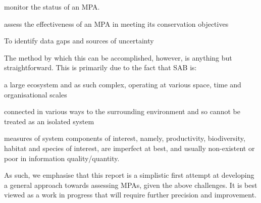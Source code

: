 \documentclass[letterpaper,portrait,12pt]{scrartcl}
\numberwithin{equation}{section}		%
\numberwithin{figure}{section}			%
\numberwithin{table}{section}				%
\begin{document}
\begin{flushleft}

	monitor the status of an MPA.

\end{flushleft}


\begin{flushleft}

	assess the effectiveness of an MPA in meeting its conservation objectives

\end{flushleft}


\begin{flushleft}

	To identify data gaps and sources of uncertainty 

\end{flushleft}








The method by which this can be accomplished, however, is anything but straightforward. This is primarily due to the fact that SAB is:








\begin{flushleft}

	a large ecosystem and as such complex, operating at various space, time and organisational scales

\end{flushleft}


\begin{flushleft}

	connected in various ways to the surrounding environment and so cannot be treated as an isolated system

\end{flushleft}


\begin{flushleft}

	measures of system components of interest, namely, productivity, biodiversity, habitat and species of interest, are imperfect at best, and usually non-existent or poor in information quality/quantity.

\end{flushleft}








As such, we emphasise that this report is a simplistic first attempt at developing a general approach towards assessing MPAs, given the above challenges. It is best viewed as a work in progress that will require further precision and improvement.
\end{document}
